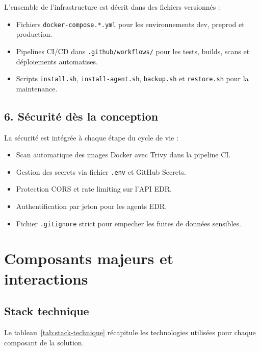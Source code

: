 L'ensemble de l'infrastructure est décrit dans des fichiers versionnés :
\begin{itemize}
  \item Fichiers \texttt{docker-compose.*.yml} pour les environnements
    dev, preprod et production.
  \item Pipelines CI/CD dans \texttt{.github/workflows/} pour les tests,
    builds, scans et déploiements automatises.
  \item Scripts \texttt{install.sh}, \texttt{install-agent.sh},
    \texttt{backup.sh} et \texttt{restore.sh} pour la maintenance.
\end{itemize}

\subsection*{6. Sécurité dès la conception}

La sécurité est intégrée à chaque étape du cycle de vie :
\begin{itemize}
  \item Scan automatique des images Docker avec Trivy dans la pipeline CI.
  \item Gestion des secrets via fichier \texttt{.env} et GitHub Secrets.
  \item Protection CORS et rate limiting sur l'API EDR.
  \item Authentification par jeton pour les agents EDR.
  \item Fichier \texttt{.gitignore} strict pour empecher les fuites de
    données sensibles.
\end{itemize}

\section{Composants majeurs et interactions}

\subsection{Stack technique}

Le tableau~\ref{tab:stack-technique} récapitule les technologies utilisées
pour chaque composant de la solution.

